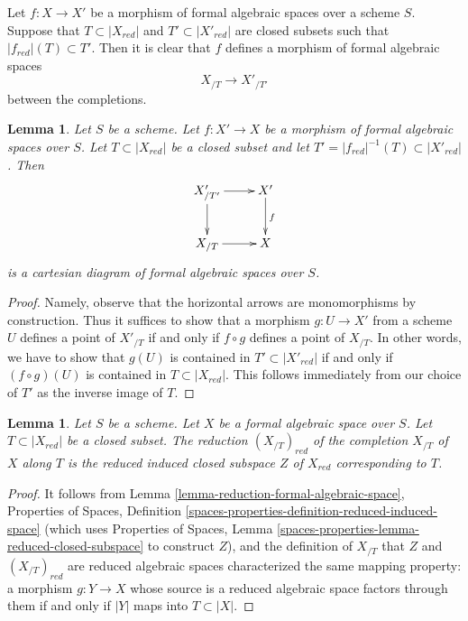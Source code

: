 \documentclass{stacks-project}
\theoremstyle{plain}
\newtheorem{lemma}[subsection]{Lemma}
\theoremstyle{definition}
\theoremstyle{remark}
\numberwithin{equation}{subsection}
\begin{document}
\noindent
Let $f : X \to X'$ be a morphism of formal algebraic spaces over a scheme $S$.
Suppose that $T \subset |X_{red}|$ and $T' \subset |X'_{red}|$
are closed subsets such that $|f_{red}|(T) \subset T'$. Then it is clear that
$f$ defines a morphism of formal algebraic spaces
$$
X_{/T} \longrightarrow X'_{/T'}
$$
between the completions.

\begin{lemma}
\label{lemma-map-recompletions}
Let $S$ be a scheme. Let $f : X' \to X$ be a morphism
of formal algebraic spaces over $S$. Let $T \subset |X_{red}|$
be a closed subset and let $T' = |f_{red}|^{-1}(T) \subset |X'_{red}|$.
Then
$$
\xymatrix{
X'_{/T'} \ar[r] \ar[d] & X' \ar[d]^f \\
X_{/T} \ar[r] & X
}
$$
is a cartesian diagram of formal algebraic spaces over $S$.
\end{lemma}

\begin{proof}
Namely, observe that the horizontal arrows are monomorphisms
by construction. Thus it suffices to show that a morphism
$g : U \to X'$ from a scheme $U$ defines a point of $X'_{/T}$
if and only if $f \circ g$ defines a point of $X_{/T}$.
In other words, we have to show that
$g(U)$ is contained in $T' \subset |X'_{red}|$
if and only if $(f \circ g)(U)$ is contained in $T \subset |X_{red}|$.
This follows immediately from our choice of $T'$ as the
inverse image of $T$.
\end{proof}

\begin{lemma}
\label{lemma-reduction-recompletion}
Let $S$ be a scheme. Let $X$ be a formal algebraic space over $S$.
Let $T \subset |X_{red}|$ be a closed subset. The reduction
$(X_{/T})_{red}$ of the completion $X_{/T}$ of $X$ along $T$ is
the reduced induced closed subspace $Z$ of $X_{red}$ corresponding to $T$.
\end{lemma}

\begin{proof}
It follows from Lemma \ref{lemma-reduction-formal-algebraic-space},
Properties of Spaces, Definition
\ref{spaces-properties-definition-reduced-induced-space}
(which uses Properties of Spaces, Lemma
\ref{spaces-properties-lemma-reduced-closed-subspace} to construct $Z$),
and the definition of $X_{/T}$ that
$Z$ and $(X_{/T})_{red}$ are reduced algebraic spaces
characterized the same mapping property:
a morphism $g : Y \to X$ whose source is a reduced algebraic space
factors through them if and only if $|Y|$ maps into $T \subset |X|$.
\end{proof}
\end{document}
